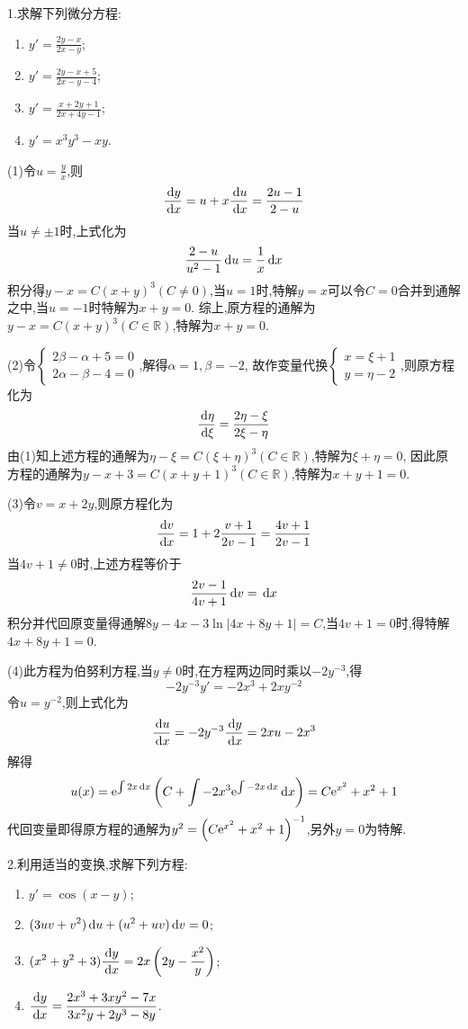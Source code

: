 1.求解下列微分方程:
\begin{enumerate}
\item $\displaystyle y'=\frac{2y-x}{2x-y}$;
\item $\displaystyle y'=\frac{2y-x+5}{2x-y-4}$;
\item $\displaystyle y'=\frac{x+2y+1}{2x+4y-1}$;
\item $\displaystyle y'=x^3y^3-xy$.
\end{enumerate}

\begin{solve}
(1)令$u=\frac{y}{x}$,则\[\frac{\,\mathrm{d} y}{\,\mathrm{d} x}=u+x\frac{\,\mathrm{d} u}{\,\mathrm{d} x}=\frac{2u-1}{2-u}\]
当$u\neq\pm1$时,上式化为
\[\frac{2-u}{u^2-1}\,\mathrm{d} u=\frac{1}{x}\,\mathrm{d} x\]
积分得$y-x=C(x+y)^3(C\neq0)$,当$u=1$时,特解$y=x$可以令$C=0$合并到通解之中,当$u=-1$时特解为$x+y=0$.
综上,原方程的通解为$y-x=C(x+y)^3(C\in\mathbb{R})$,特解为$x+y=0$.

(2)令$\begin{cases}2\beta-\alpha+5=0\\2\alpha-\beta-4=0\end{cases}$,解得$\alpha=1,\beta=-2$,
故作变量代换$\begin{cases}x=\xi+1\\y=\eta-2\end{cases}$,则原方程化为
\[\frac{\,\mathrm{d}\eta}{\,\mathrm{d}\xi}=\frac{2\eta-\xi}{2\xi-\eta}\]
由(1)知上述方程的通解为$\eta-\xi=C(\xi+\eta)^3(C\in\mathbb{R})$,特解为$\xi+\eta=0$,
因此原方程的通解为$y-x+3=C(x+y+1)^3(C\in\mathbb{R})$,特解为$x+y+1=0$.

(3)令$v=x+2y$,则原方程化为
\[\frac{\,\mathrm{d} v}{\,\mathrm{d} x}=1+2\frac{v+1}{2v-1}=\frac{4v+1}{2v-1}\]
当$4v+1\neq0$时,上述方程等价于\[\frac{2v-1}{4v+1}\,\mathrm{d} v=\,\mathrm{d} x\]
积分并代回原变量得通解$8y-4x-3\ln|4x+8y+1|=C$,当$4v+1=0$时,得特解$4x+8y+1=0$.

(4)此方程为伯努利方程,当$y\neq0$时,在方程两边同时乘以$-2y^{-3}$,得
\[-2y^{-3}y'=-2x^3+2xy^{-2}\]
令$u=y^{-2}$,则上式化为
\[\frac{\,\mathrm{d} u}{\,\mathrm{d} x}=-2y^{-3}\frac{\,\mathrm{d} y}{\,\mathrm{d} x}=2xu-2x^3\]
解得
\[u(x)=\mathrm{e}^{\int2x\,\mathrm{d} x}\left(C+\int-2x^3\mathrm{e}^{\int-2x\,\mathrm{d} x}\,\mathrm{d} x\right)=C\mathrm{e}^{x^2}+x^2+1\]
代回变量即得原方程的通解为$y^2=\left(C\mathrm{e}^{x^2}+x^2+1\right)^{-1}$,另外$y=0$为特解.
\end{solve}


2.利用适当的变换,求解下列方程:
\begin{enumerate}[(1)]
\item $\displaystyle y'=\cos(x-y)$;
\item $\displaystyle(3uv+v^2)\,\mathrm{d} u+(u^2+uv)\,\mathrm{d} v=0$;
\item $\displaystyle(x^2+y^2+3)\frac{\,\mathrm{d} y}{\,\mathrm{d} x}=2x\left(2y-\frac{x^2}{y}\right)$;
\item $\displaystyle\frac{\,\mathrm{d} y}{\,\mathrm{d} x}=\frac{2x^3+3xy^2-7x}{3x^2y+2y^3-8y}$.
\end{enumerate}

